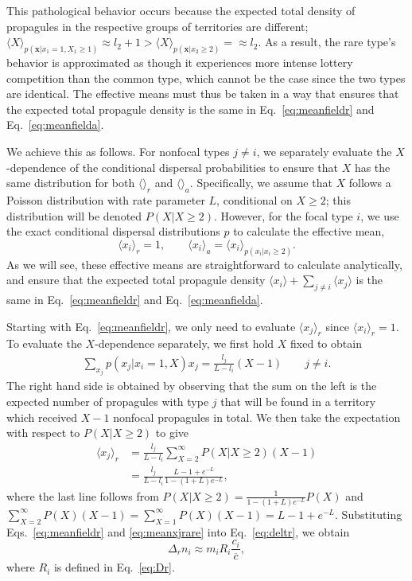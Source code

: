 \documentclass[12pt]{article}
\begin{document}
This pathological behavior occurs because the expected total density of propagules in the respective groups of territories are different; $\langle X \rangle_{p({\mathbf x}|x_1=1,X_1\geq 1)}\approx l_2+1 > \langle X \rangle_{p({\mathbf x}|x_2\geq 2)}=\approx l_2 $. As a result, the rare type's behavior is approximated as though it experiences more intense lottery competition than the common type, which cannot be the case since the two types are identical. The effective means must thus be taken in a way that ensures that the expected total propagule density is the same in Eq.~\eqref{eq:meanfieldr} and Eq.~\eqref{eq:meanfielda}. 

We achieve this as follows. For nonfocal types $j\neq i$, we separately evaluate the $X$-dependence of the conditional dispersal probabilities to ensure that $X$ has the same distribution for both $\langle \rangle_r$ and $\langle \rangle_a$. Specifically, we assume that $X$ follows a Poisson distribution with rate parameter $L$, conditional on $X\geq 2$; this distribution will be denoted $P(X|X\geq 2)$. However, for the focal type $i$, we use the exact conditional dispersal distributions $p$ to calculate the effective mean, 
\begin{equation}
\langle x_i \rangle_r=1,\qquad \langle x_i \rangle_a = \langle x_i \rangle_{p(x_i|x_i\geq 2)}. \label{eq:effectivefocal}
\end{equation}
As we will see, these effective means are straightforward to calculate analytically, and ensure that the expected total propagule density $\langle x_i \rangle + \sum_{j\neq i} \langle x_j \rangle$ is the same in Eq.~\eqref{eq:meanfieldr} and Eq.~\eqref{eq:meanfielda}.

Starting with Eq.~\eqref{eq:meanfieldr}, we only need to evaluate $\langle x_j \rangle_r$ since $\langle x_i \rangle_r=1$. To evaluate the $X$-dependence separately, we first hold $X$ fixed to obtain
\begin{align}
\sum_{x_j} p(x_j|x_i=1,X)x_j=\frac{l_j}{L-l_i}(X-1) \qquad j\neq i.
\label{eq:raremonster1}
\end{align}
The right hand side is obtained by observing that the sum on the left is the expected number of propagules with type $j$ that will be found in a territory which received $X-1$ nonfocal propagules in total. We then take the expectation with respect to $P(X|X\geq 2)$ to give
\begin{align}
\langle x_j \rangle_r&=\frac{l_j}{L-l_i}\sum_{X=2}^{\infty} P(X|X\geq 2) (X-1)\nonumber\\
&=\frac{l_j}{L-l_i}\frac{L-1+e^{-L}}{1-(1+L)e^{-L}},
\label{eq:meanxjrare}
\end{align}
where the last line follows from $P(X|X\geq 2) =\frac{1}{{1-(1+L)e^{-L}}}P(X)$ and $\sum_{X=2}^{\infty} P(X)(X-1)=\sum_{X=1}^{\infty} P(X)(X-1)=L-1+e^{-L}$. Substituting Eqs.~\eqref{eq:meanfieldr} and \eqref{eq:meanxjrare} into Eq.~\eqref{eq:deltr}, we obtain
\begin{equation}
\Delta_r n_i\approx m_i R_i\frac{c_i}{\overline{c}}, \label{eq:deltrfinal}
\end{equation}
where $R_i$ is defined in Eq.~\eqref{eq:Dr}.
\end{document}
